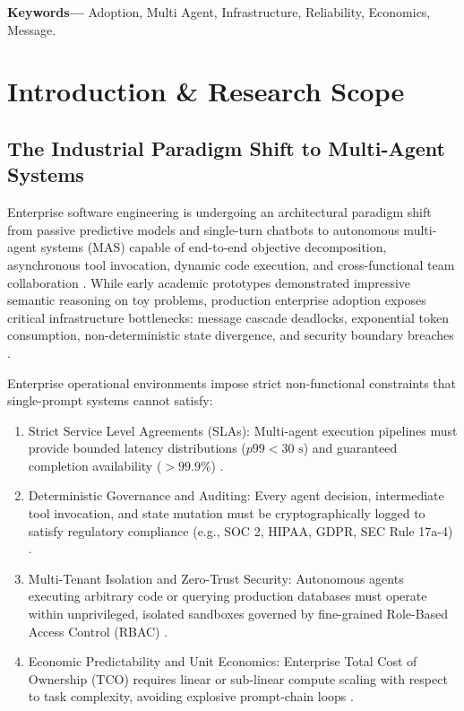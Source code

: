 \documentclass[10pt,journal,compsoc,twocolumn]{IEEEtran}
\begin{document}
\noindent\textbf{Keywords---} Adoption, Multi Agent, Infrastructure, Reliability, Economics, Message.







\section{Introduction \& Research Scope}



\subsection{The Industrial Paradigm Shift to Multi-Agent Systems}


Enterprise software engineering is undergoing an architectural paradigm shift from passive predictive models and single-turn chatbots to autonomous multi-agent systems (MAS) capable of end-to-end objective decomposition, asynchronous tool invocation, dynamic code execution, and cross-functional team collaboration \cite{arxiv_2405_01543,arxiv_2005_14165}. While early academic prototypes demonstrated impressive semantic reasoning on toy problems, production enterprise adoption exposes critical infrastructure bottlenecks: message cascade deadlocks, exponential token consumption, non-deterministic state divergence, and security boundary breaches \cite{arxiv_2404_04289,crossref_10_1016_j_aei_2026_104392}.

Enterprise operational environments impose strict non-functional constraints that single-prompt systems cannot satisfy:
\begin{enumerate}
  \item Strict Service Level Agreements (SLAs): Multi-agent execution pipelines must provide bounded latency distributions ($p99 < 30\text{ s}$) and guaranteed completion availability ($>99.9\%$) \cite{crossref_10_1108_jeim_12_2025_1269}.
  \item Deterministic Governance and Auditing: Every agent decision, intermediate tool invocation, and state mutation must be cryptographically logged to satisfy regulatory compliance (e.g., SOC 2, HIPAA, GDPR, SEC Rule 17a-4) \cite{arxiv_2411_15594}.
  \item Multi-Tenant Isolation and Zero-Trust Security: Autonomous agents executing arbitrary code or querying production databases must operate within unprivileged, isolated sandboxes governed by fine-grained Role-Based Access Control (RBAC) \cite{arxiv_2404_04289,doaj_001772c2113c476d9d5d40452c8e10e1}.
  \item Economic Predictability and Unit Economics: Enterprise Total Cost of Ownership (TCO) requires linear or sub-linear compute scaling with respect to task complexity, avoiding explosive prompt-chain loops \cite{arxiv_2406_00584}.
\end{enumerate}
\end{document}
